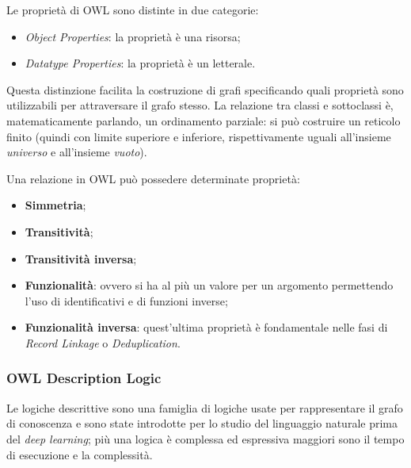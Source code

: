 \documentclass[11pt]{article}
\begin{document}
Le proprietà di OWL sono distinte in due categorie:
\begin{itemize}
  \item \textit{Object Properties}: la proprietà è una risorsa;
  \item \textit{Datatype Properties}: la proprietà è un letterale. 
\end{itemize}
Questa distinzione facilita la costruzione di grafi specificando quali proprietà sono utilizzabili per attraversare il grafo stesso.
La relazione tra classi e sottoclassi è, matematicamente parlando, un ordinamento parziale: si può costruire un reticolo finito (quindi con limite superiore e inferiore, rispettivamente uguali all'insieme \textit{universo} e all'insieme \textit{vuoto}).

Una relazione in OWL può possedere determinate proprietà:
\begin{itemize}
  \item \textbf{Simmetria};
  \item \textbf{Transitività};
  \item \textbf{Transitività inversa};
  \item \textbf{Funzionalità}: ovvero si ha al più un valore per un argomento permettendo l'uso di identificativi e di funzioni inverse;
  \item \textbf{Funzionalità inversa}: quest'ultima proprietà è fondamentale nelle fasi di \textit{Record Linkage} o \textit{Deduplication}.
\end{itemize}

\subsubsection{OWL Description Logic}
Le logiche descrittive sono una famiglia di logiche usate per rappresentare il grafo di conoscenza e sono state introdotte per lo studio del linguaggio naturale prima del \textit{deep learning}; più una logica è complessa ed espressiva maggiori sono il tempo di esecuzione e la complessità.
\end{document}
